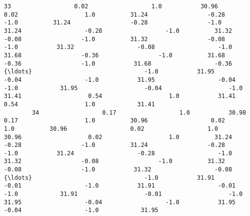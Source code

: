 \documentclass[11pt]{article}
\begin{document}
\begin{Verbatim}[commandchars=\\\{\}]
        33                  0.02                  1.0           30.96                   0.02                   1.0          31.24                 -0.28                 -1.0          31.24                 -0.28                 -1.0           31.24                  -0.28                  -1.0          31.32                 -0.08                 -1.0          31.32                 -0.08                 -1.0           31.32                  -0.08                  -1.0          31.68                 -0.36                 -1.0          31.68                 -0.36                 -1.0           31.68                  -0.36              {\ldots}                                -1.0           31.95                  -0.04                  -1.0           31.95                  -0.04                  -1.0            31.95                   -0.04                   -1.0           31.41                   0.54                   1.0           31.41                   0.54                   1.0            31.41   
        34                  0.17                  1.0           30.98                   0.17                   1.0          30.96                  0.02                  1.0          30.96                  0.02                  1.0           30.96                   0.02                   1.0          31.24                 -0.28                 -1.0          31.24                 -0.28                 -1.0           31.24                  -0.28                  -1.0          31.32                 -0.08                 -1.0          31.32                 -0.08                 -1.0           31.32                  -0.08              {\ldots}                                -1.0           31.91                  -0.01                  -1.0           31.91                  -0.01                  -1.0            31.91                   -0.01                   -1.0           31.95                  -0.04                  -1.0           31.95                  -0.04                  -1.0            31.95   
        

\end{Verbatim}
\end{document}
